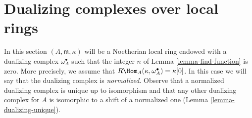 \section{Dualizing complexes over local rings}
\label{section-dualizing-local}

\noindent
In this section $(A, \mathfrak m, \kappa)$ will be a Noetherian local
ring endowed with a dualizing complex $\omega_A^\bullet$ such that
the integer $n$ of Lemma \ref{lemma-find-function} is zero.
More precisely, we assume that $R\Hom_A(\kappa, \omega_A^\bullet) = \kappa[0]$.
In this case we will say that the dualizing complex is {\it normalized}.
Observe that a normalized dualizing complex is unique up to
isomorphism and that any other dualizing complex for $A$ is isomorphic
to a shift of a normalized one (Lemma \ref{lemma-dualizing-unique}).

